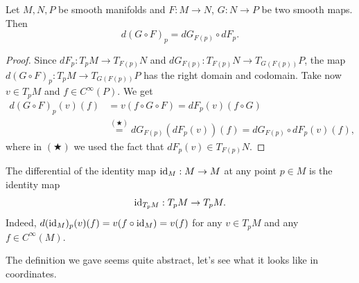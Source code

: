 \begin{theorem}\label{thm:chainrule_mfld}
	Let $M, N, P$ be smooth manifolds and $F: M \to N$, $G: N\to P$ be two smooth maps. Then
	\begin{equation}
		d(G\circ F)_p = dG_{F(p)} \circ dF_p.
	\end{equation}
\end{theorem}
\begin{proof}
	Since $dF_p : T_p M \to T_{F(p)}N$ and $dG_{F(p)}: T_{F(p)}N \to T_{G(F(p))}P$, the map $d(G\circ F)_p: T_p M \to T_{G(F(p))}P$ has the right domain and codomain.
	Take now $v\in T_p M$ and $f\in C^\infty(P)$. We get
	\begin{align}
		d(G\circ F)_p(v)(f) & = v(f\circ G \circ F)
		= dF_p (v)(f\circ G)                                                  \\
		                    & \stackrel{(\bigstar)}{=} dG_{F(p)}(dF_p (v))(f)
		= dG_{F(p)} \circ dF_p (v)(f),
	\end{align}
	where in $(\bigstar)$ we used the fact that $dF_p (v)\in T_{F(p)}N$.
\end{proof}

\begin{remark}
	The differential of the identity map $\operatorname{id}_M:M\to M$ at any point $p\in M$ is the identity map
	\begin{equation}
		\operatorname{id}_{T_pM}: T_pM \to T_pM.
	\end{equation}
	Indeed, $d (\operatorname{id}_M)_p(v)(f) = v(f\circ\operatorname{id}_M) = v(f)$ for any $v\in T_pM$ and any $f\in C^\infty(M)$.
\end{remark}

The definition we gave seems quite abstract, let's see what it looks like in coordinates.


